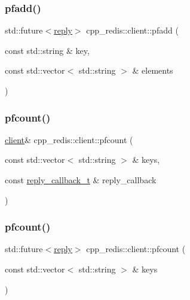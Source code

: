 \mbox{\label{classcpp__redis_1_1client_ac6534e0aaf0ef3c87e312b12fd1a5a97}} 
\subsubsection{\texorpdfstring{pfadd()}{pfadd()}\hspace{0.1cm}{\footnotesize\ttfamily [2/2]}}
{\footnotesize\ttfamily std\+::future$<$\hyperlink{classcpp__redis_1_1reply}{reply}$>$ cpp\+\_\+redis\+::client\+::pfadd (\begin{DoxyParamCaption}\item[{const std\+::string \&}]{key,  }\item[{const std\+::vector$<$ std\+::string $>$ \&}]{elements }\end{DoxyParamCaption})}

\mbox{\label{classcpp__redis_1_1client_acf88e97aac689b64af0e73843811d837}} 
\subsubsection{\texorpdfstring{pfcount()}{pfcount()}\hspace{0.1cm}{\footnotesize\ttfamily [1/2]}}
{\footnotesize\ttfamily \hyperlink{classcpp__redis_1_1client}{client}\& cpp\+\_\+redis\+::client\+::pfcount (\begin{DoxyParamCaption}\item[{const std\+::vector$<$ std\+::string $>$ \&}]{keys,  }\item[{const \hyperlink{classcpp__redis_1_1client_a061a1140d36d2eaeda82b09a0bb3f9f2}{reply\+\_\+callback\+\_\+t} \&}]{reply\+\_\+callback }\end{DoxyParamCaption})}

\mbox{\label{classcpp__redis_1_1client_ad357677011d10800e2595db129bfbfff}} 
\subsubsection{\texorpdfstring{pfcount()}{pfcount()}\hspace{0.1cm}{\footnotesize\ttfamily [2/2]}}
{\footnotesize\ttfamily std\+::future$<$\hyperlink{classcpp__redis_1_1reply}{reply}$>$ cpp\+\_\+redis\+::client\+::pfcount (\begin{DoxyParamCaption}\item[{const std\+::vector$<$ std\+::string $>$ \&}]{keys }\end{DoxyParamCaption})}

